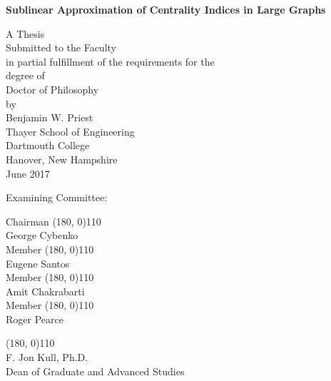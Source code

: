 \documentclass[10]{report}
\begin{document}

\begin{center}
\textbf{Sublinear Approximation of Centrality Indices in Large Graphs}
\vspace{0.4cm}

A Thesis \\
Submitted to the Faculty \\
in partial fulfillment of the requirements for the \\
degree of \\[0.4cm]
Doctor of Philosophy \\[0.4cm]
by\\[0.5cm]
Benjamin W. Priest\\[0.4cm]
Thayer School of Engineering \\
Dartmouth College \\
Hanover, New Hampshire \\[0.4cm]
June 2017 
\vspace{0.5cm}

\end{center}

Examining Committee:

\begin{flushright}
Chairman \line(180, 0){110} \\
George Cybenko\\[1cm]

Member \line(180, 0){110} \\
Eugene Santos\\[1cm]

Member \line(180, 0){110} \\
Amit Chakrabarti \\[1cm]

Member \line(180, 0){110} \\
Roger Pearce\\[1cm]


\end{flushright}

\begin{flushleft}
\line(180, 0){110} \\
F. Jon Kull, Ph.D.\\
Dean of Graduate and Advanced Studies\\[1cm]
\end{flushleft}
\end{document}
